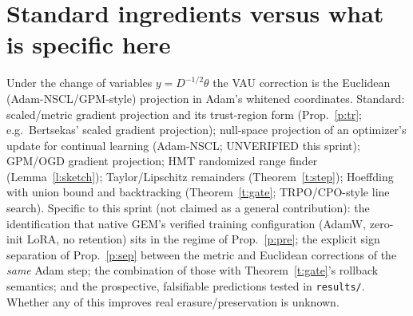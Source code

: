 \documentclass[11pt]{article}
\theoremstyle{remark}
\begin{document}
\section{Standard ingredients versus what is specific here}
Under the change of variables $y=D^{-1/2}\theta$ the VAU correction is the Euclidean (Adam-NSCL/GPM-style) projection in Adam's whitened coordinates. Standard: scaled/metric gradient projection and its trust-region form (Prop.~\ref{p:tr}; e.g.\ Bertsekas' scaled gradient
projection); null-space projection of an optimizer's update for continual learning (Adam-NSCL; UNVERIFIED this sprint);
GPM/OGD gradient projection; HMT randomized range finder (Lemma~\ref{l:sketch}); Taylor/Lipschitz remainders
(Theorem~\ref{t:step}); Hoeffding with union bound and backtracking (Theorem~\ref{t:gate}; TRPO/CPO-style line search).
Specific to this sprint (not claimed as a general contribution): the identification that native GEM's verified training
configuration (AdamW, zero-init LoRA, no retention) sits in the regime of Prop.~\ref{p:pre}; the explicit sign
separation of Prop.~\ref{p:sep} between the metric and Euclidean corrections of the \emph{same} Adam step; the
combination of those with Theorem~\ref{t:gate}'s rollback semantics; and the prospective, falsifiable predictions tested
in \texttt{results/}. Whether any of this improves real erasure/preservation is unknown.
\end{document}
